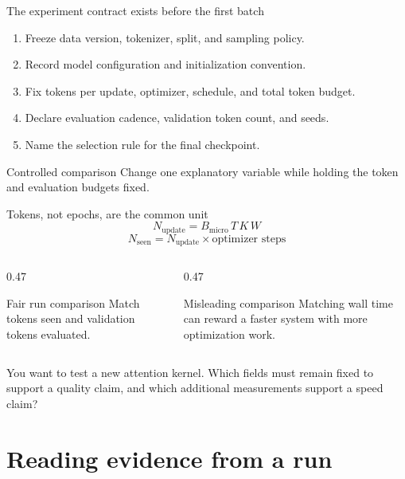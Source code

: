 \documentclass[handout]{beamer}
\begin{document}
\begin{frame}{The experiment contract exists before the first batch}
  \begin{enumerate}
    \setlength{\itemsep}{7pt}
    \item Freeze data version, tokenizer, split, and sampling policy.
    \item Record model configuration and initialization convention.
    \item Fix tokens per update, optimizer, schedule, and total token budget.
    \item Declare evaluation cadence, validation token count, and seeds.
    \item Name the selection rule for the final checkpoint.
  \end{enumerate}
  \begin{block}{Controlled comparison}
    Change one explanatory variable while holding the token and evaluation budgets fixed.
  \end{block}
\end{frame}

\begin{frame}{Tokens, not epochs, are the common unit}
  \[
    N_{\text{update}}=B_{\text{micro}}\,T\,K\,W
  \]
  \[
    N_{\text{seen}}=N_{\text{update}}\times\text{optimizer steps}
  \]
  \begin{columns}[t]
    \begin{column}{0.47\linewidth}
      \begin{block}{Fair run comparison}
        Match tokens seen and validation tokens evaluated.
      \end{block}
    \end{column}
    \begin{column}{0.47\linewidth}
      \begin{alertblock}{Misleading comparison}
        Matching wall time can reward a faster system with more optimization work.
      \end{alertblock}
    \end{column}
  \end{columns}
\end{frame}

  {You want to test a new attention kernel. Which fields must remain fixed to support a quality claim, and which additional measurements support a speed claim?}

\section{Reading evidence from a run}
\end{document}
